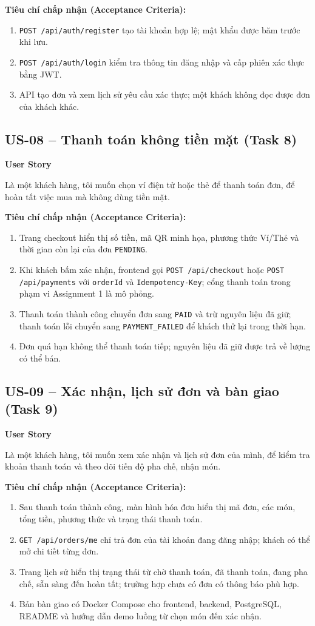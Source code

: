 \textbf{Tiêu chí chấp nhận (Acceptance Criteria):}
\begin{enumerate}
  \item \texttt{POST /api/auth/register} tạo tài khoản hợp lệ; mật khẩu được băm trước khi lưu.
  \item \texttt{POST /api/auth/login} kiểm tra thông tin đăng nhập và cấp phiên xác thực bằng JWT.
  \item API tạo đơn và xem lịch sử yêu cầu xác thực; một khách không đọc được đơn của khách khác.
\end{enumerate}

\subsection{US-08 -- Thanh toán không tiền mặt (Task 8)}
\textbf{User Story}\par
Là một khách hàng, tôi muốn chọn ví điện tử hoặc thẻ để thanh toán đơn, để hoàn tất việc mua mà không dùng tiền mặt.

\textbf{Tiêu chí chấp nhận (Acceptance Criteria):}
\begin{enumerate}
  \item Trang checkout hiển thị số tiền, mã QR minh họa, phương thức Ví/Thẻ và thời gian còn lại của đơn \texttt{PENDING}.
  \item Khi khách bấm xác nhận, frontend gọi \texttt{POST /api/checkout} hoặc \texttt{POST /api/payments} với \texttt{orderId} và \texttt{Idempotency-Key}; cổng thanh toán trong phạm vi Assignment 1 là mô phỏng.
  \item Thanh toán thành công chuyển đơn sang \texttt{PAID} và trừ nguyên liệu đã giữ; thanh toán lỗi chuyển sang \texttt{PAYMENT\_FAILED} để khách thử lại trong thời hạn.
  \item Đơn quá hạn không thể thanh toán tiếp; nguyên liệu đã giữ được trả về lượng có thể bán.
\end{enumerate}

\subsection{US-09 -- Xác nhận, lịch sử đơn và bàn giao (Task 9)}
\textbf{User Story}\par
Là một khách hàng, tôi muốn xem xác nhận và lịch sử đơn của mình, để kiểm tra khoản thanh toán và theo dõi tiến độ pha chế, nhận món.

\textbf{Tiêu chí chấp nhận (Acceptance Criteria):}
\begin{enumerate}
  \item Sau thanh toán thành công, màn hình hóa đơn hiển thị mã đơn, các món, tổng tiền, phương thức và trạng thái thanh toán.
  \item \texttt{GET /api/orders/me} chỉ trả đơn của tài khoản đang đăng nhập; khách có thể mở chi tiết từng đơn.
  \item Trang lịch sử hiển thị trạng thái từ chờ thanh toán, đã thanh toán, đang pha chế, sẵn sàng đến hoàn tất; trường hợp chưa có đơn có thông báo phù hợp.
  \item Bản bàn giao có Docker Compose cho frontend, backend, PostgreSQL, README và hướng dẫn demo luồng từ chọn món đến xác nhận.
\end{enumerate}

